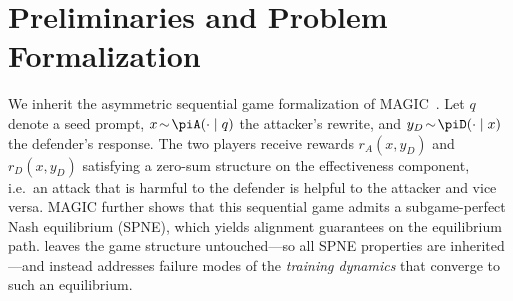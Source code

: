 \section{Preliminaries and Problem Formalization}
\label{sec:preliminaries}

We inherit the asymmetric sequential game formalization of MAGIC~\citep{magic2025}. Let $q$ denote a seed prompt, $x\!\sim\!\piA(\cdot\mid q)$ the attacker's rewrite, and $y_D\!\sim\!\piD(\cdot\mid x)$ the defender's response. The two players receive rewards $r_A(x,y_D)$ and $r_D(x,y_D)$ satisfying a zero-sum structure on the effectiveness component, i.e.\ an attack that is harmful to the defender is helpful to the attacker and vice versa. MAGIC further shows that this sequential game admits a subgame-perfect Nash equilibrium (SPNE), which yields alignment guarantees on the equilibrium path. \method leaves the game structure untouched---so all SPNE properties are inherited---and instead addresses failure modes of the \emph{training dynamics} that converge to such an equilibrium.


